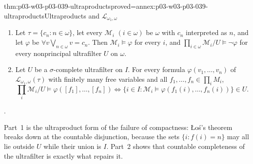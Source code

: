 \begin{hbtheorem}{thm:p03-w03-p03-039-ultraproducts}{proved=annex:p03-w03-p03-039-ultraproducts}{Ultraproducts and \(\mathcal L_{\omega_1,\omega}\)}
\begin{enumerate}
\item Let \(\tau=\{c_n:n\in\omega\}\), let every \(\mathcal M_i\)
      \((i\in\omega)\) be \(\omega\) with \(c_n\) interpreted as \(n\), and let
      \(\varphi\) be \(\forall v\bigvee_{n\in\omega}v=c_n\). Then
      \(\mathcal M_i\models\varphi\) for every \(i\), and
      \(\prod_{i\in\omega}\mathcal M_i/U\models\neg\varphi\) for every
      nonprincipal ultrafilter \(U\) on \(\omega\).
\item Let \(U\) be a \(\sigma\)-complete ultrafilter on \(I\). For every
      formula \(\varphi(v_1,\dots,v_n)\) of \(\mathcal L_{\omega_1,\omega}(\tau)\)
      with finitely many free variables and all \(f_1,\dots,f_n\in\prod_iM_i\),
      \[
      \textstyle\prod_i\mathcal M_i/U\models\varphi([f_1],\dots,[f_n])
      \iff\{i\in I:\mathcal M_i\models\varphi(f_1(i),\dots,f_n(i))\}\in U .
      \]
\end{enumerate}
\cite[Ex.~1.6, p.~6]{Marker2014InfinitaryNotes}.
\end{hbtheorem}

Part~1 is the ultraproduct form of the failure of compactness: \L o\'s's
theorem breaks down at the countable disjunction, because the sets
\(\{i:f(i)=n\}\) may all lie outside \(U\) while their union is \(I\). Part~2
shows that countable completeness of the ultrafilter is exactly what repairs
it.

